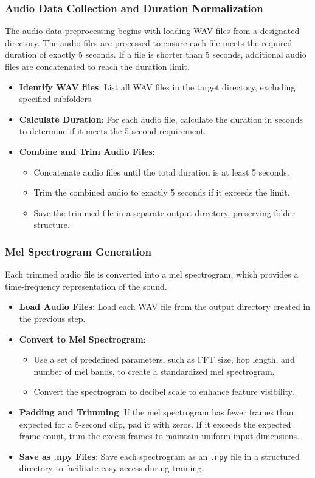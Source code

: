 \documentclass[conference]{IEEEtran}
\begin{document}
\subsubsection{Audio Data Collection and Duration Normalization}
The audio data preprocessing begins with loading WAV files from a designated directory. The audio files are processed to ensure each file meets the required duration of exactly 5 seconds. If a file is shorter than 5 seconds, additional audio files are concatenated to reach the duration limit.

\begin{itemize}
    \item \textbf{Identify WAV files}: List all WAV files in the target directory, excluding specified subfolders.
    \item \textbf{Calculate Duration}: For each audio file, calculate the duration in seconds to determine if it meets the 5-second requirement.
    \item \textbf{Combine and Trim Audio Files}:
        \begin{itemize}
            \item Concatenate audio files until the total duration is at least 5 seconds.
            \item Trim the combined audio to exactly 5 seconds if it exceeds the limit.
            \item Save the trimmed file in a separate output directory, preserving folder structure.
        \end{itemize}
\end{itemize}

\subsubsection{Mel Spectrogram Generation}
Each trimmed audio file is converted into a mel spectrogram, which provides a time-frequency representation of the sound.

\begin{itemize}
    \item \textbf{Load Audio Files}: Load each WAV file from the output directory created in the previous step.
    \item \textbf{Convert to Mel Spectrogram}:
        \begin{itemize}
            \item Use a set of predefined parameters, such as FFT size, hop length, and number of mel bands, to create a standardized mel spectrogram.
            \item Convert the spectrogram to decibel scale to enhance feature visibility.
        \end{itemize}
    \item \textbf{Padding and Trimming}: If the mel spectrogram has fewer frames than expected for a 5-second clip, pad it with zeros. If it exceeds the expected frame count, trim the excess frames to maintain uniform input dimensions.
    \item \textbf{Save as .npy Files}: Save each spectrogram as an \texttt{.npy} file in a structured directory to facilitate easy access during training.
\end{itemize}
\end{document}
